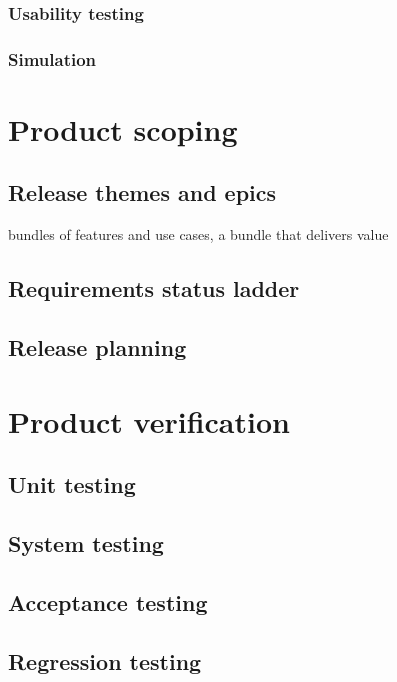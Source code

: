 \documentclass{reqengbook}
\begin{document}
\subsection{Usability testing}

\subsection{Simulation}


\chapter{Product scoping}

\section{Release themes and epics}

bundles of features and use cases, a bundle that delivers value

\section{Requirements status ladder}

\section{Release planning} 

\chapter{Product verification}
\section{Unit testing}
\section{System testing}
\section{Acceptance testing}
\section{Regression testing}
\end{document}
